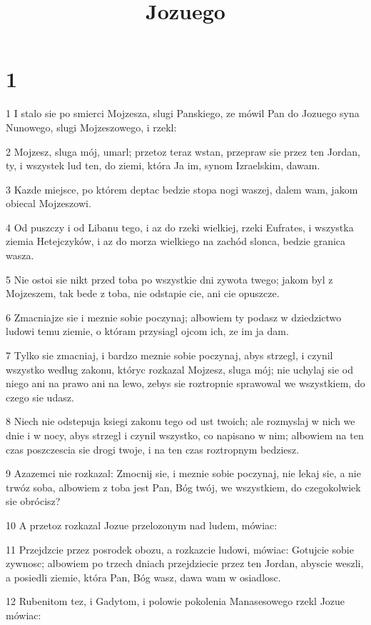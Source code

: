 

\title{Jozuego}


\chapter{1}

\par 1 I stalo sie po smierci Mojzesza, slugi Panskiego, ze mówil Pan do Jozuego syna Nunowego, slugi Mojzeszowego, i rzekl:
\par 2 Mojzesz, sluga mój, umarl; przetoz teraz wstan, przepraw sie przez ten Jordan, ty, i wszystek lud ten, do ziemi, która Ja im, synom Izraelskim, dawam.
\par 3 Kazde miejsce, po którem deptac bedzie stopa nogi waszej, dalem wam, jakom obiecal Mojzeszowi.
\par 4 Od puszczy i od Libanu tego, i az do rzeki wielkiej, rzeki Eufrates, i wszystka ziemia Hetejczyków, i az do morza wielkiego na zachód slonca, bedzie granica wasza.
\par 5 Nie ostoi sie nikt przed toba po wszystkie dni zywota twego; jakom byl z Mojzeszem, tak bede z toba, nie odstapie cie, ani cie opuszcze.
\par 6 Zmacniajze sie i meznie sobie poczynaj; albowiem ty podasz w dziedzictwo ludowi temu ziemie, o któram przysiagl ojcom ich, ze im ja dam.
\par 7 Tylko sie zmacniaj, i bardzo meznie sobie poczynaj, abys strzegl, i czynil wszystko wedlug zakonu, któryc rozkazal Mojzesz, sluga mój; nie uchylaj sie od niego ani na prawo ani na lewo, zebys sie roztropnie sprawowal we wszystkiem, do czego sie udasz.
\par 8 Niech nie odstepuja ksiegi zakonu tego od ust twoich; ale rozmyslaj w nich we dnie i w nocy, abys strzegl i czynil wszystko, co napisano w nim; albowiem na ten czas poszczescia sie drogi twoje, i na ten czas roztropnym bedziesz.
\par 9 Azazemci nie rozkazal: Zmocnij sie, i meznie sobie poczynaj, nie lekaj sie, a nie trwóz soba, albowiem z toba jest Pan, Bóg twój, we wszystkiem, do czegokolwiek sie obrócisz?
\par 10 A przetoz rozkazal Jozue przelozonym nad ludem, mówiac:
\par 11 Przejdzcie przez posrodek obozu, a rozkazcie ludowi, mówiac: Gotujcie sobie zywnosc; albowiem po trzech dniach przejdziecie przez ten Jordan, abyscie weszli, a posiedli ziemie, która Pan, Bóg wasz, dawa wam w osiadlosc.
\par 12 Rubenitom tez, i Gadytom, i polowie pokolenia Manasesowego rzekl Jozue mówiac:
